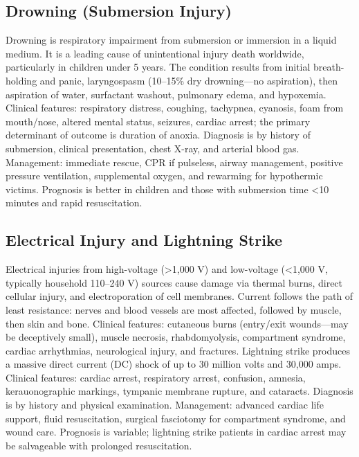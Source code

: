\subsection{Drowning (Submersion Injury)}
\label{sec:Drowning}
Drowning is respiratory impairment from submersion or immersion in a liquid medium. It is a leading cause of unintentional injury death worldwide, particularly in children under 5 years. The condition results from initial breath-holding and panic, laryngospasm (10--15\% dry drowning---no aspiration), then aspiration of water, surfactant washout, pulmonary edema, and hypoxemia. Clinical features: respiratory distress, coughing, tachypnea, cyanosis, foam from mouth/nose, altered mental status, seizures, cardiac arrest; the primary determinant of outcome is duration of anoxia. Diagnosis is by history of submersion, clinical presentation, chest X-ray, and arterial blood gas. Management: immediate rescue, CPR if pulseless, airway management, positive pressure ventilation, supplemental oxygen, and rewarming for hypothermic victims. Prognosis is better in children and those with submersion time <10 minutes and rapid resuscitation.

\subsection{Electrical Injury and Lightning Strike}
\label{sec:Electrical Injury}
Electrical injuries from high-voltage (>1,000 V) and low-voltage (<1,000 V, typically household 110--240 V) sources cause damage via thermal burns, direct cellular injury, and electroporation of cell membranes. Current follows the path of least resistance: nerves and blood vessels are most affected, followed by muscle, then skin and bone. Clinical features: cutaneous burns (entry/exit wounds---may be deceptively small), muscle necrosis, rhabdomyolysis, compartment syndrome, cardiac arrhythmias, neurological injury, and fractures. Lightning strike produces a massive direct current (DC) shock of up to 30 million volts and 30,000 amps. Clinical features: cardiac arrest, respiratory arrest, confusion, amnesia, kerauonographic markings, tympanic membrane rupture, and cataracts. Diagnosis is by history and physical examination. Management: advanced cardiac life support, fluid resuscitation, surgical fasciotomy for compartment syndrome, and wound care. Prognosis is variable; lightning strike patients in cardiac arrest may be salvageable with prolonged resuscitation.

